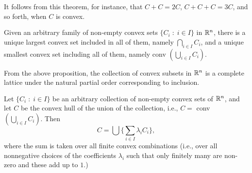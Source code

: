 \documentclass[11pt,a4paper]{article}
\begin{document}
\begin{remark}
    It follows from this theorem, for instance, that $C+C = 2C$, $C+C+C = 3C$, and so forth, when $C$ is convex.
\end{remark}

\begin{proposition}
    Given an arbitrary family of non-empty convex sets $\{C_i\;:\;i\in I\}$ in $\mathbb{R}^n$, there is a unique largest convex set included in all of them, namely $\bigcap_{i\in I}C_i$, and a unique smallest convex set including all of them, namely conv $(\bigcup_{i\in I} C_i)$.
\end{proposition}

\begin{remark}\label{remark:convex_sets_complete_lattice}
    From the above proposition, the collection of convex subsets in $\mathbb{R}^n$ is a complete lattice under the natural partial order corresponding to inclusion.
\end{remark}

\begin{theorem}\label{thm:convex_hull_finite_convex_combinations}
    Let $\{C_i\;:\;i\in I\}$ be an arbitrary collection of non-empty convex sets of $\mathbb{R}^n$, and let $C$ be the convex hull of the union of the collection, i.e., $C =$ conv $(\bigcup_{i\in I}C_i)$. Then
    \begin{equation*}
        C = \bigcup\Big\{\sum_{i\in I}\lambda_i C_i\Big\},
    \end{equation*}
    where the sum is taken over all finite convex combinations (i.e., over all nonnegative choices of the coefficients $\lambda_i$ such that only finitely many are non-zero and these add up to $1$.)
\end{theorem}
\end{document}
